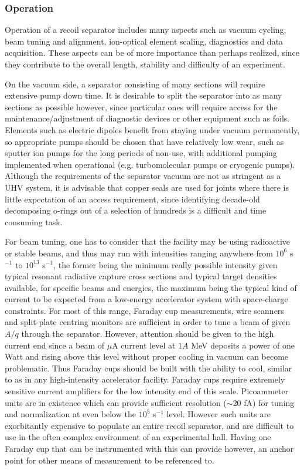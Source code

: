 \subsubsection{Operation}

Operation of a recoil separator includes many aspects such as vacuum cycling, beam tuning and alignment, ion-optical element scaling, diagnostics and data acquisition. These aspects can be of more importance than perhaps realized, since they contribute to the overall length, stability and difficulty of an experiment. 

On the vacuum side, a separator consisting of many sections will require extensive pump down time. It is desirable to split the separator into as many sections as possible however, since particular ones will require access for the maintenance/adjustment of diagnostic devices or other equipment such as foils. Elements such as electric dipoles benefit from staying under vacuum permanently, so appropriate pumps should be chosen that have relatively low wear, such as sputter ion pumps for the long periods of non-use, with additional pumping implemented when operational (e.g. turbomolecular pumps or cryogenic pumps). Although the requirements of the separator vacuum are not as stringent as a UHV system, it is advisable that copper seals are used for joints where there is little expectation of an access requirement, since identifying decade-old decomposing o-rings out of a selection of hundreds is a difficult and time consuming task.

For beam tuning, one has to consider that the facility may be using radioactive or stable beams, and thus may run with intensities ranging anywhere from $10^{6}$ s$^{-1}$ to $10^{13}$ s$^{-1}$, the former being the minimum really possible intensity given typical resonant radiative capture cross sections and typical target densities available, for specific beams and energies, the maximum being the typical kind of current to be expected from a low-energy accelerator system with space-charge constraints. For most of this range, Faraday cup measurements, wire scanners and split-plate centring monitors are sufficient in order to tune a beam of given $A/q$ through the separator. However, attention should be given to the high current end since a beam of $\mu$A current level at $1A$ MeV deposits a power of  one Watt and rising above this level without proper cooling in vacuum can become problematic. Thus Faraday cups should be built with the ability to cool, similar to as in any high-intensity accelerator facility. Faraday cups require extremely sensitive current amplifiers for the low intensity end of this scale. Picoammeter units are in existence which can provide sufficient resolution ($\sim$20 fA) for tuning and normalization at even below the $10^{5}$ s$^{-1}$ level. However such units are exorbitantly expensive to populate an entire recoil separator, and are difficult to use in the often complex environment of an experimental hall. Having one Faraday cup that can be instrumented with this can provide however, an anchor point for other means of measurement to be referenced to. 


